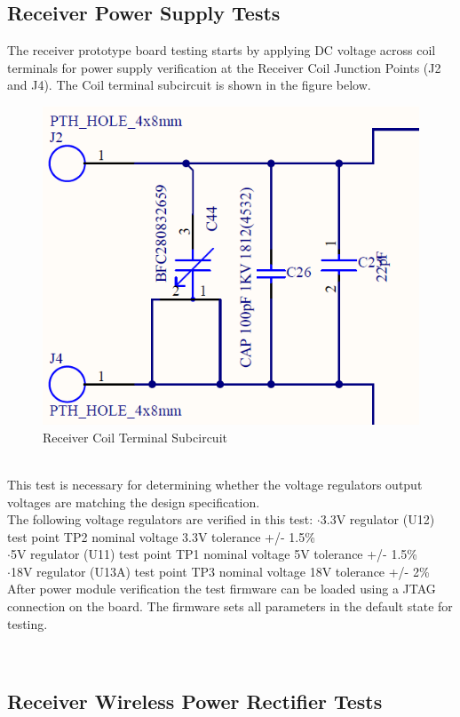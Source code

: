 \documentclass[12pt]{article}
\begin{document}
\subsection{Receiver Power Supply Tests}
\indent
The receiver prototype board testing starts by applying DC voltage across coil terminals for power supply verification at the Receiver Coil Junction Points (J2 and J4).  The Coil terminal subcircuit is shown in the figure below.
\hfill
\begin{figure}[h!]
\centering
\includegraphics[width=0.75\linewidth]{RX_COIL_TERMINALS}
\caption{Receiver Coil Terminal Subcircuit}
\end{figure}
\hfill \\
\indent
This test is necessary for determining whether the voltage regulators output voltages are matching the design specification.\\

\noindent
The following voltage regulators are verified in this test:
\indent \indent $\cdot$3.3V regulator (U12) test point TP2 nominal voltage 3.3V  tolerance +/- 1.5\%\\
\indent \indent $\cdot$5V regulator (U11) test point TP1 nominal voltage 5V  tolerance +/- 1.5\%\\
\indent \indent $\cdot$18V regulator (U13A) test point TP3 nominal voltage 18V tolerance +/- 2\%\\

\noindent
After power module verification the test firmware can be loaded using a JTAG connection on the board.  The firmware sets all parameters in the default state for testing.

\hfill \\
\pagebreak

\subsection{Receiver Wireless Power Rectifier Tests}
\end{document}
